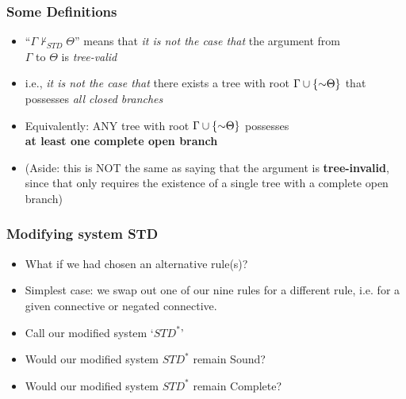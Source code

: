\begin{frame}
\frametitle{Some Definitions}

\begin{itemize}[<+->]

\item ``$\Gamma \nvdash_{STD} \Theta$'' means that \textit{it is not the case that} the argument from \\ $\Gamma$ to $\Theta$ is  \emph{tree-valid}

\item i.e., \textit{it is not the case that} there exists a tree with root $\Gamma \cup \{\enot \Theta \}$ that possesses \emph{all closed branches}

\item \textcolor{OGlyallpink}{Equivalently}: ANY tree with root $\Gamma \cup \{\enot \Theta \}$ possesses \\   \textbf{at least one \textcolor{OGlyallpink}{complete open branch}}

\item (Aside: this is NOT the same as saying that the argument is \textcolor{OGlyallpink}{\textbf{tree-invalid}}, since that only requires the existence of a single tree with a complete open branch) 

\end{itemize}
\end{frame}

\begin{frame}
\frametitle{Modifying system STD}

\begin{itemize}[<+->]

\item What if we had chosen an alternative rule(s)? 

\item Simplest case: we swap out one of our nine rules for a different rule, i.e. for a given connective or negated connective. 

\item Call our modified system `$STD^{\ast}$'%




\item Would our modified system $STD^{\ast}$ remain Sound?

\item Would our modified system $STD^{\ast}$ remain Complete?

\end{itemize}
\end{frame}

